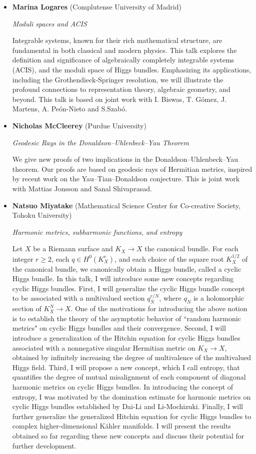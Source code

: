 \documentclass{article}
\begin{document}
\begin{itemize}
\item {\bf Marina Logares} (Complutense University of Madrid)

{\it Moduli spaces and ACIS}

Integrable systems, known for their rich mathematical structure, are fundamental in both classical and modern physics. This talk explores the definition and significance of algebraically completely integrable systems (ACIS), and the moduli space of Higgs bundles. Emphasizing its applications, including the Grothendieck-Springer resolution, we will illustrate the profound connections to representation theory, algebraic geometry, and beyond. This talk is based on joint work with I. Biswas, T. G\'omez, J. Martens, A. Pe\'on-Nieto and S.Szab\'o.


\item {\bf Nicholas McCleerey} (Purdue University)

{\it Geodesic Rays in the Donaldson--Uhlenbeck--Yau Theorem}

We give new proofs of two implications in the Donaldson--Uhlenbeck--Yau theorem. Our proofs are based on geodesic rays of Hermitian metrics, inspired by recent work on the Yau--Tian--Donaldson conjecture. This is joint work with Mattias Jonsson and Sanal Shivaprasad.


\item {\bf Natsuo Miyatake} (Mathematical Science Center for Co-creative Society, Tohoku University)

{\it Harmonic metrics, subharmonic functions, and entropy}

Let $X$ be a Riemann surface and $K_X\rightarrow X$ the canonical bundle. For each integer $r\geq 2$, each $q\in H^0(K_X^r)$, and each choice of the square root $K_X^{1/2}$ of the canonical bundle, we canonically obtain a Higgs bundle, called a cyclic Higgs bundle. In this talk, I will introduce some new concepts regarding cyclic Higgs bundles. First, I will generalize the cyclic Higgs bundle concept to be associated with a multivalued section $q_N^{r/N}$, where $q_N$ is a holomorphic section of $K_X^N\rightarrow X$. One of the motivations for introducing the above notion is to establish the theory of the asymptotic behavior of ``random harmonic metrics" on cyclic Higgs bundles and their convergence. Second, I will introduce a generalization of the Hitchin equation for cyclic Higgs bundles associated with a nonnegative singular Hermitian metric on $K_X\rightarrow X$, obtained by infinitely increasing the degree of multivalence of the multivalued Higgs field. Third, I will propose a new concept, which I call entropy, that quantifies the degree of mutual misalignment of each component of diagonal harmonic metrics on cyclic Higgs bundles. In introducing the concept of entropy, I was motivated by the domination estimate for harmonic metrics on cyclic Higgs bundles established by Dai-Li and Li-Mochizuki. Finally, I will further generalize the generalized Hitchin equation for cyclic Higgs bundles to complex higher-dimensional K\"ahler manifolds. I will present the results obtained so far regarding these new concepts and discuss their potential for further development.


\end{itemize}
\end{document}

